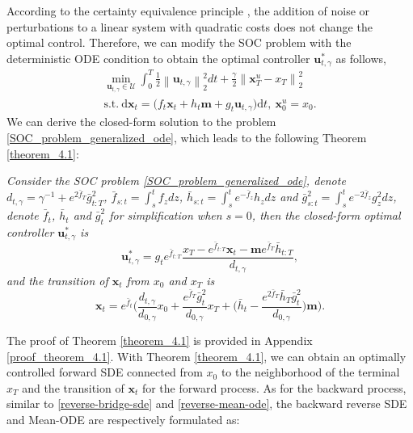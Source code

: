 According to the certainty equivalence principle \cite{chen2024generativemodelingphasestochastic, RB}, the addition of noise or perturbations to a linear system with quadratic costs does not change the optimal control. Therefore, we can modify the SOC problem with the deterministic ODE condition to obtain the optimal controller $\mathbf{u}_{t, \gamma}^{*}$ as follows, 
\begin{equation}\label{SOC_problem_generalized_ode}
\begin{gathered}
\min_{\mathbf{u}_{t, \gamma}\in \mathcal{U} } \int_0^T \frac{1}{2} \left\|\mathbf{u}_{t, \gamma}\right\|_2^2 d t+\frac{\gamma}{2}\left\|\mathbf{x}_T^{u}-x_T\right\|_2^2 \\
\text{s.t.} \ \mathrm{d} \mathbf{x}_t = \Big( f_t \mathbf{x}_t + h_t \mathbf{m} + g_t \mathbf{u}_{t, \gamma} \Big) \mathrm{d} t, \ \mathbf{x}_0^u=x_0.
\end{gathered}
\end{equation}
We can derive the closed-form solution to the problem \eqref{SOC_problem_generalized_ode}, which leads to the following Theorem \ref{theorem_4.1}: 
\begin{theorem}\label{theorem_4.1} 
\textit{Consider the SOC problem \eqref{SOC_problem_generalized_ode}, denote $d_{t, \gamma} = \gamma^{-1} + e^{2\bar{f}_{T}} \bar{g}^2_{t:T}$, $\bar{f}_{s:t} = \int_{s}^{t} f_z dz$, $\bar{h}_{s:t} = \int_{s}^{t} e^{-\bar{f}_{z}} h_z dz$ and $\bar{g}^2_{s:t} = \int_{s}^{t} e^{-2\bar{f}_{z}}g^2_z dz$, denote $\bar{f}_{t}$, $\bar{h}_{t}$ and $\bar{g}^2_{t}$ for simplification when $s=0$, then the closed-form optimal controller $\mathbf{u}_{t,\gamma}^{*}$ is} 
\begin{equation}\label{general_optimal_controller}
\mathbf{u}_{t, \gamma}^{*} = g_t e^{\bar{f}_{t:T}} \frac{x_{T} - e^{\bar{f}_{t:T}} \mathbf{x}_t - \mathbf{m} e^{\bar{f}_{T}} \bar{h}_{t:T}}{d_{t, \gamma}},
\end{equation}
\textit{and the transition of $\mathbf{x}_t$ from $x_0$ and $x_T$ is}
\begin{equation}\label{general_interpolant}
\mathbf{x}_t = e^{\bar{f}_{t}} \Bigg(\frac{d_{t, \gamma}}{d_{0, \gamma}} x_0 + \frac{e^{\bar{f}_{T}} \bar{g}^2_{t}}{d_{0, \gamma}} x_T + \Big(\bar{h}_{t} - \frac{e^{2\bar{f}_{T}} \bar{h}_{T} \bar{g}^2_{t}}{d_{0, \gamma}}\Big) \mathbf{m}\Bigg). 
\end{equation}
\end{theorem}
The proof of Theorem \ref{theorem_4.1} is provided in Appendix \ref{proof_theorem_4.1}. With Theorem \ref{theorem_4.1}, we can obtain an optimally controlled forward SDE connected from $x_0$ to the neighborhood of the terminal $x_T$ and the transition of $\mathbf{x}_t$ for the forward process. As for the backward process, similar to \eqref{reverse-bridge-sde} and \eqref{reverse-mean-ode}, the backward reverse SDE and Mean-ODE are respectively formulated as: 
